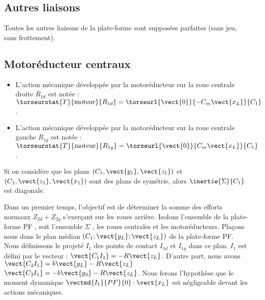 \subsection*{Autres liaisons}
Toutes les autres liaisons de la plate-forme sont supposées parfaites (sans jeu, sans frottement).

\subsection*{Motoréducteur centraux}
\ifprof
\else

\begin{itemize}
\item L'action mécanique développée par la motoréducteur sur la roue centrale droite $R_{1d}$ est notée : 
$\torseurstat{T}{\text{moteur}}{R_{1d}} = \torseurl{\vect{0}}{-C_m\vect{x_L}}{C_1}$.
\item L'action mécanique développée par la motoréducteur sur la roue centrale gauche $R_{1g}$ est notée : 
$\torseurstat{T}{\text{moteur}}{R_{1g}} = \torseurl{\vect{0}}{C_m\vect{x_L}}{C_1}$.
\end{itemize}
\fi

\ifprof
\begin{corrige}
Si on considère que les plans  $\left(C_1,\vect{y_1},\vect{z_1}\right)$ et 
$\left(C_1,\vect{z_1},\vect{x_1}\right)$ sont des plans de symétrie, alors $\inertie{\Sigma}{C_1}$ est diagonale.
\end{corrige}
\else
\fi


\ifprof
\else
Dans un premier temps, l’objectif est de déterminer la somme des efforts normaux $Z_{2d}+Z_{2g}$ s’exerçant sur les roues
arrière. Isolons l’ensemble de la plate-forme PF , soit l’ensemble $\Sigma$ , les roues centrales et les motoréducteurs.
Plaçons nous dans le plan médian $\left(C_1;\vect{y_L};\vect{z_L}\right)$ de la plate-forme PF. Nous définissons le projeté $I_1$ des points de contact $I_{1d}$ et $I_{1g}$ dans ce plan. $I_1$ est défini par le vecteur : $\vect{C_1I_1}=-R\vect{z_L}$. 
D’autre part, nous avons 
$\vect{C_2I_1} = b\vect{y_L}-R\vect{z_L}$
$\vect{C_3I_1} = -b\vect{y_3}-R\vect{z_L}$.
Nous ferons l’hypothèse que le moment dynamique $\vectmd{I_1}{PF}{0}\cdot \vect{x_L}$
est négligeable devant les actions mécaniques.

\fi

